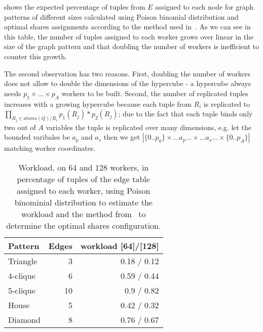  shows the expected percentage of tuples from $E$ assigned to each node for graph patterns of different sizes calculated using Poison binomial distribution and optimal shares assignments according to the method used in~\cite{myria-detailed}.
As we can see in this table, the number of tuples assigned to each worker grows over linear in the size of the graph pattern and that doubling the number of workers is inefficient to counter this growth.

The second observation has two reasons.
First, doubling the number of workers does not allow to double the dimensions of the hypercube - a hypercube always needs $p_1 \times ... \times p_A$ workers to be built.
Second, the number of replicated tuples increases with a growing hypercube because each tuple from $R_i$ is replicated to $\prod_{R_j \in atoms(Q)/R_i} p_1(R_j) * p_2(R_j)$; due to the fact that each tuple binds only two out of $A$ variables the tuple is replicated over many dimensions, e.g. let the bounded varibales be $a_p$ and $a_s$ then we get  $|\{0..p_0\} \times ... a_p ... \times ... a_s... \times \{0..p_A\}|$ matching worker coordinates.



\begin{table}[t]
    \centering
    \begin{tabular}{lrr}
        \toprule
        Pattern  & Edges  & workload [64]/[128] \\ \midrule
        Triangle & 3                 & 0.18 / 0.12    \\
        4-clique & 6                 & 0.59 / 0.44    \\
        5-clique & 10                & 0.9  / 0.82    \\
        House    & 5                 & 0.42 / 0.32    \\
        Diamond  & 8                 & 0.76 / 0.67    \\
        \bottomrule
    \end{tabular}
    \caption{Workload, on 64 and 128 workers, in percentage of tuples of the edge table assigned to each worker, using Poison binominial distribution to estimate the workload and the method from~\cite{myria-detailed} to determine the optimal shares configuration.}
    \label{table:workload}
\end{table}

